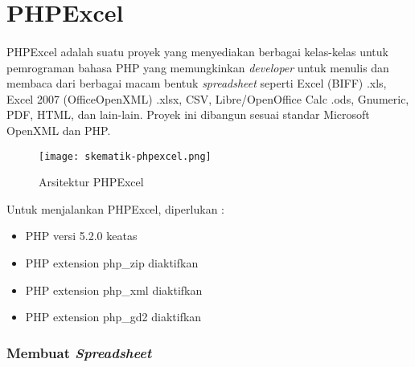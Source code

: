 \section{PHPExcel} 
\label{phpexcel}

\paragraph{} PHPExcel adalah suatu proyek yang menyediakan berbagai kelas-kelas untuk pemrograman bahasa PHP yang memungkinkan \textit{developer} untuk menulis dan membaca dari berbagai macam bentuk \textit{spreadsheet} seperti Excel (BIFF) .xls, Excel 2007 (OfficeOpenXML) .xlsx, CSV, Libre/OpenOffice Calc .ods, Gnumeric, PDF, HTML, dan lain-lain. Proyek ini dibangun sesuai standar Microsoft OpenXML dan PHP.\cite{phpexcel:14} 

\begin{figure} [H]
	\centering  
	\texttt{[image: skematik-phpexcel.png]}  
	\caption[Arsitektur PHPExcel]{Arsitektur PHPExcel} 
	\label{fig:skematik-phpexcel} 
\end{figure}

Untuk menjalankan PHPExcel, diperlukan :
\begin{itemize}
	\item  PHP versi 5.2.0 keatas
	\item  PHP extension php\_zip diaktifkan
	\item  PHP extension php\_xml diaktifkan
	\item  PHP extension php\_gd2 diaktifkan 
\end{itemize}

\subsubsection{Membuat \textit{Spreadsheet}}
